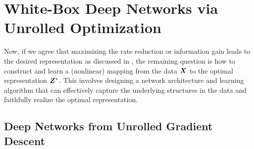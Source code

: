 \documentclass[\toplevelprefix/book-main.tex]{subfiles}
\begin{document}




\section{White-Box Deep Networks via Unrolled Optimization}\label{sec:chap4-white-box-model-via-unrolling}


Now, if we agree that maximizing the rate reduction or information gain leads to the desired representation as discussed in , the remaining question is how to construct and learn a (nonlinear) mapping from the data $\bm{X}$ to the optimal representation $\bm{Z}^*$. This involves designing a network architecture and learning algorithm that can effectively capture the underlying structures in the data and faithfully realize the optimal representation. 


\subsection{Deep Networks from Unrolled Gradient Descent}
\end{document}
